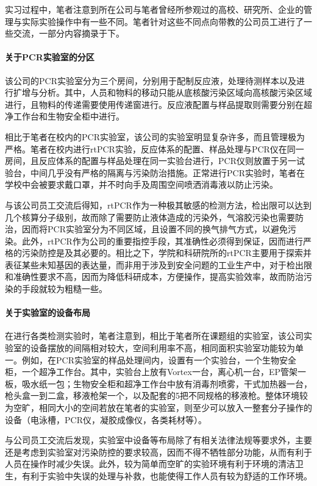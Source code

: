 实习过程中，笔者注意到所在公司与笔者曾经所参观过的高校、研究所、企业的管理与实际实验操作中有一些不同。笔者针对这些不同点向带教的公司员工进行了一些交流，一部分内容摘录于下。

\paragraph{关于PCR实验室的分区} 该公司的PCR实验室分为三个房间，分别用于配制反应液，处理待测样本以及进行扩增与分析。其中，人员和物料的移动只能从底核酸污染区域向高核酸污染区域进行，且物料的传递需要使用传递窗进行。反应液配置与样品提取则需要分别在超净工作台和生物安全柜中进行。

相比于笔者在校内的PCR实验室，该公司的实验室明显复杂许多，而且管理极为严格。笔者在校内进行rtPCR实验，反应体系的配置、样品处理与PCR仪在同一房间，且反应体系的配置与样品处理在同一实验台进行，PCR仪则放置于另一试验台，中间几乎没有严格的隔离与污染防治措施。正常进行PCR实验时，笔者在学校中会被要求戴口罩，并不时向手及周围空间喷洒消毒液以防止污染。

与该公司员工交流后得知，rtPCR作为一种极其敏感的检测方法，检出限可以达到几个核算分子级别，故而除了需要防止液体造成的污染外，气溶胶污染也需要防治，因而将PCR实验室分为不同区域，且设置不同的换气排气方式，以避免污染。此外，rtPCR作为公司的重要指控手段，其准确性必须得到保证，因而进行严格的污染防控是及其必要的。相比之下，学院和科研院所的rtPCR主要用于探索并表征某些未知基因的表达量，而非用于涉及到安全问题的工业生产中，对于检出限和准确性要求不高，因而为降低科研成本，方便操作，提高实验效率，故而防治污染的手段就较为粗糙一些。

\paragraph{关于实验室的设备布局} 在进行各类检测实验时，笔者注意到，相比于笔者所在课题组的实验室，该公司实验室的设备摆放的间隔相对较大，空间利用率不高，相同面积实验室功能较为单一。例如，在PCR实验室的样品处理间内，设置有一个实验台，一个生物安全柜，一个超净工作台。其中，实验台上放有Vortex一台，离心机一台，EP管架一板，吸水纸一包；生物安全柜和超净工作台中放有消毒剂喷雾，干式加热器一台，枪头盒一到二盒，移液枪架一个，以及配套的5把不同规格的移液枪。整体环境较为空旷，相同大小的空间若放在笔者的实验室，则至少可以放入一整套分子操作的设备（电泳槽，PCR仪，凝胶成像仪，各类耗材等）。

与公司员工交流后发现，实验室中设备等布局除了有相关法律法规等要求外，主要还是考虑到实验室对污染防控的要求较高，因而不得不牺牲部分功能，从而有利于人员在操作时减少失误。此外，较为简单而空旷的实验环境有利于环境的清洁卫生，有利于实验中失误的处理与补救，也能使得工作人员有较为舒适的工作环境。

